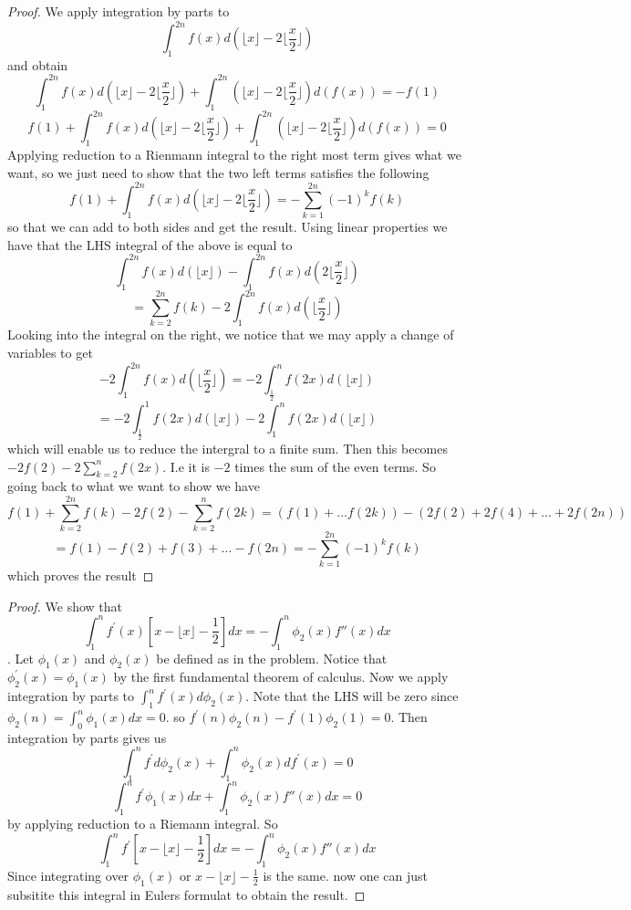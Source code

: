 \documentclass[11pt,largemargins]{homework}
\begin{document}
\question 
\begin{proof} 

We apply integration by parts to 
\[\int_1^{2n} f(x)d(\lfloor x \rfloor - 2 \lfloor \frac{x}{2} \rfloor) \] 
and obtain 
\[\int_1^{2n} f(x)d(\lfloor x \rfloor - 2 \lfloor \frac{x}{2} \rfloor) +\int_1^{2n}(\lfloor x \rfloor - 2 \lfloor \frac{x}{2} \rfloor)  d(f(x)) = -f(1) \] 
\[ f(1) +\int_1^{2n} f(x)d(\lfloor x \rfloor - 2 \lfloor \frac{x}{2} \rfloor) + \int_1^{2n}(\lfloor x \rfloor - 2 \lfloor \frac{x}{2} \rfloor)  d(f(x)) =0  \]  
Applying reduction to a Rienmann integral to the right most term gives what we want, so we just need to show that the two left terms  satisfies the following  
\[f(1) + \int_1^{2n} f(x)d(\lfloor x \rfloor - 2 \lfloor \frac{x}{2} \rfloor) = - \sum_{k=1}^{2n} (-1)^kf(k) \] 
so that we can add to both sides and get the result. 
Using linear properties we have that the LHS integral of the above is equal to  
\[ \int_1^{2n} f(x)d(\lfloor x \rfloor) - \int_1^{2n} f(x)d(2\lfloor \frac{x}{2} \rfloor) \] 
\begin{equation} = \sum_{k=2}^{2n} f(k) -2 \int_1^{2n} f(x)d(\lfloor \frac{x}{2} \rfloor) \end{equation}
Looking into the integral on the right, we notice that we may apply a change of variables to get 
\[ -2 \int_1^{2n} f(x)d(\lfloor \frac{x}{2} \rfloor) = -2 \int_{\frac{1}{2}}^n f(2x)d(\lfloor x \rfloor) \] 
\[= -2 \int_{\frac{1}{2}}^1 f(2x) d(\lfloor x \rfloor) -2 \int_1^n f(2x) d(\lfloor x \rfloor)\]
which will enable us to reduce the intergral to a finite sum. 
Then this becomes $-2f(2) -2 \sum_{k = 2}^n f(2x) $. I.e it is $-2$ times the sum of the even terms. So going back to what we want to show we have  
\[f(1) + \sum_{k = 2}^{2n}f(k) - 2 f(2) - \sum_{k=2}^n f(2k) = (f(1) + \dots f(2k)) - (2f(2) + 2f(4) + \dots + 2f(2n)) \]
\[ = f(1) - f(2) + f(3) + \dots - f(2n) = - \sum_{k=1}^{2n} (-1)^kf(k) \] 
which proves the result

\end{proof}
\question 
\begin{proof} 
We show that 
\[ \int_1^n f^\prime(x) [x - \lfloor x \rfloor - \frac{1}{2}] dx= - \int_1^n \phi_2(x) f''(x) dx\].
Let $\phi_1(x)$ and $\phi_2(x)$ be defined as in the problem. Notice that $\phi_2^\prime(x) = \phi_1(x)$ by the first fundamental theorem of calculus. 
Now we apply integration by parts to $\int_1^n f^\prime(x) d\phi_2(x)$. Note that the LHS will be zero since $\phi_2(n) = \int_0^n \phi_1(x) dx = 0$. 
so $f^\prime(n)\phi_2(n) - f^\prime(1)\phi_2(1) = 0$. 
Then integration by parts gives us 
\[ \int_1^n f^\prime d\phi_2(x) + \int_1^n \phi_2(x) df^\prime(x) = 0\] 
\[ \int_1^n f^\prime \phi_1(x) dx + \int_1^n \phi_2(x) f''(x)dx= 0 \] 
by applying reduction to a Riemann integral. So 
\[ \int_1^n f^\prime [x - \lfloor x \rfloor - \frac{1}{2} ] dx  = -\int_1^n \phi_2(x) f''(x) dx \] 
Since integrating over $\phi_1(x) $ or $x - \lfloor x \rfloor - \frac{1}{2}$ is the same. now one can just subsitite this integral in Eulers formulat to obtain the result. 
\end{proof}
 
\end{document}
